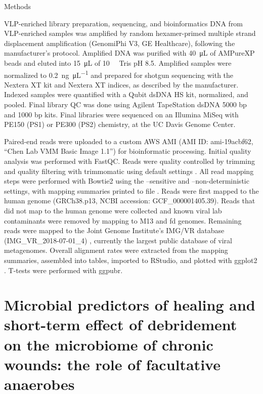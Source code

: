 \documentclass[oneside,12pt,final]{sty/ucthesis-CA2012}
\begin{document}
\begin{mainmatter}
\begin{section}{Methods}
\begin{subsection}{VLP-enriched library preparation, sequencing, and bioinformatics}
DNA from VLP-enriched samples was amplified by random hexamer-primed multiple strand displacement amplification (GenomiPhi V3, GE Healthcare), following the manufacturer’s protocol. Amplified DNA was purified with \SI{40}{\micro\liter} of AMPureXP beads and eluted into \SI{15}{\micro\liter} of \SI{10}{\milli\molar} Tris pH 8.5. Amplified samples were normalized to \SI{0.2}{\nano\gram\per\micro\liter} and prepared for shotgun sequencing with the Nextera XT kit and Nextera XT indices, as described by the manufacturer. Indexed samples were quantified with a Qubit dsDNA HS kit, normalized, and pooled. Final library QC was done using Agilent TapeStation dsDNA 5000 bp and 1000 bp kits. Final libraries were sequenced on an Illumina MiSeq with PE150 (PS1) or PE300 (PS2) chemistry, at the UC Davis Genome Center.

Paired-end reads were uploaded to a custom AWS AMI (AMI ID: ami-19acbf62, “Chen Lab VMM Basic Image 1.1”) for bioinformatic processing. Initial quality analysis was performed with FastQC. Reads were quality controlled by trimming and quality filtering with trimmomatic using default settings \cite{RN82}. All read mapping steps were performed with Bowtie2 using the –sensitive and –non-deterministic settings, with mapping summaries printed to file \cite{RN85}. Reads were first mapped to the human genome (GRCh38.p13, NCBI accession: GCF\_000001405.39). Reads that did not map to the human genome were collected and known viral lab contaminants were removed by mapping to M13 and fd genomes. Remaining reads were mapped to the Joint Genome Institute’s IMG/VR database (IMG\_VR\_2018-07-01\_4) \cite{RN78}, currently the largest public database of viral metagenomes. Overall alignment rates were extracted from the mapping summaries, assembled into tables, imported to RStudio, and plotted with ggplot2 \cite{RN46}. T-tests were performed with ggpubr.
\end{subsection}


\end{section}

\chapter{Microbial predictors of healing and short-term effect of debridement on the microbiome of chronic wounds: the role of facultative anaerobes}\newpage
\label{Chapter 3}


\end{mainmatter}
\end{document}
